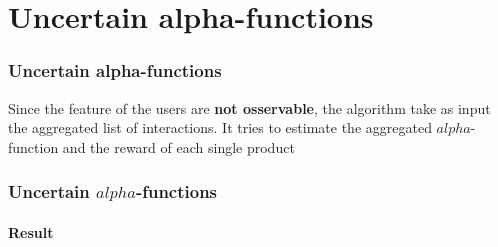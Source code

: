 \documentclass[11pt]{beamer}
\begin{document}
\AtBeginSection[]
{
\begin{frame}{}
    \tableofcontents[sections={\thesection}]
\end{frame}
}


\section{Uncertain alpha-functions}

\begin{frame}

\frametitle{Uncertain alpha-functions}
Since the feature of the users are \textbf{not osservable}, the algorithm take as input the aggregated list of interactions.
It tries to estimate the aggregated $alpha$-function and the reward of each single product

\end{frame}


\begin{frame}

\frametitle{Uncertain $alpha$-functions}
\framesubtitle{Result}

\end{frame}








\end{document}
